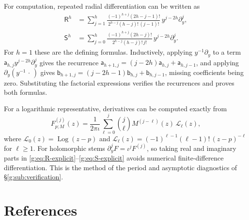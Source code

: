 \documentclass[11pt,a4paper]{article}
\numberwithin{equation}{section}
\theoremstyle{definition}
\theoremstyle{remark}
\theoremstyle{plain}
\begin{document}
For computation, repeated radial differentiation can be written as
\begin{align}
 \mathsf R^h&=\sum_{j=1}^h\frac{(-1)^{h+j}(2h-j-1)!}{2^{h-j}(h-j)!\,(j-1)!}\,
 y^{j-2h}\partial_y^j,\label{g:eq:R-explicit}\\
 \mathsf S^h&=\sum_{j=0}^h\frac{(-1)^{h+j}(2h-j)!}{2^{h-j}(h-j)!\,j!}\,
 y^{j-2h}\partial_y^j.\label{g:eq:S-explicit}
\end{align}
For $h=1$ these are the defining formulas. Inductively, applying
$y^{-1}\partial_y$ to a term $\mathsf a_{h,j}y^{j-2h}\partial_y^j$ gives the
recurrence $\mathsf a_{h+1,j}=(j-2h)\mathsf a_{h,j}+\mathsf a_{h,j-1}$, and
applying $\partial_y(y^{-1}\,\cdot\,)$ gives
$\mathsf b_{h+1,j}=(j-2h-1)\mathsf b_{h,j}+\mathsf b_{h,j-1}$, missing
coefficients being zero. Substituting the factorial expressions verifies the
recurrences and proves both formulas.

For a logarithmic representative, derivatives can be computed exactly from
\begin{equation}\label{g:eq:log-jets-algorithm}
 F_{p;M}^{(j)}(z)=\frac1{2\pi\iota}\sum_{\ell=0}^j\binom j\ell
 M^{(j-\ell)}(z)\,\mathscr L_\ell(z),
\end{equation}
where $\mathscr L_0(z)=\operatorname{Log}(z-p)$ and
$\mathscr L_\ell(z)=(-1)^{\ell-1}(\ell-1)!\,(z-p)^{-\ell}$ for $\ell\ge1$.
For holomorphic stems $\partial_y^jF=\iota^jF^{(j)}$, so taking real and imaginary
parts in \eqref{g:eq:R-explicit}--\eqref{g:eq:S-explicit} avoids numerical
finite-difference differentiation. This is the method of the period and
asymptotic diagnostics of \S\ref{g:sub:verification}.

\clearpage
\section*{References}
\end{document}
